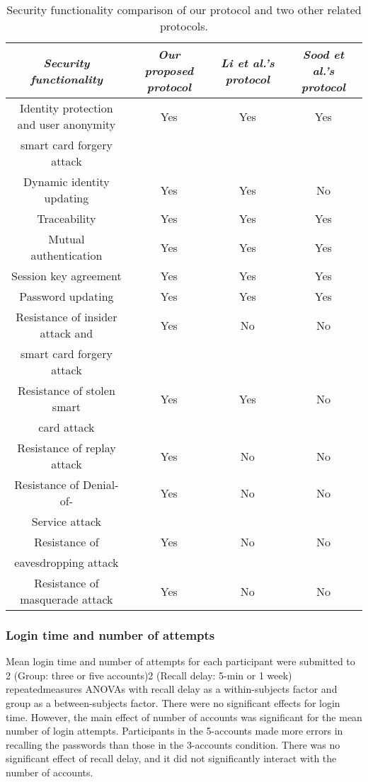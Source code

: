\documentclass[fleqn]{Paquetes/RevDigMatEduInt}
\begin{document}
\begin{table}[ht!!!]
	\begin{minipage}{0.7\textwidth}
	\caption{Security functionality comparison of our protocol and two other related protocols.}
	\centering
	\begin{tabular}{|c|c|c|c|}
 \hline
		\emph{Security functionality} & \emph{Our proposed protocol} & \emph{Li et al.’s protocol}  & \emph{Sood et al.’s protocol}\\ \midrule
		Identity protection and user anonymity & Yes & Yes & Yes\\ 
        smart card forgery attack &&& \\
		Dynamic identity updating & Yes & Yes & No \\
        Traceability & Yes & Yes & Yes \\
        Mutual authentication & Yes & Yes & Yes \\
        Session key agreement & Yes & Yes & Yes \\
        Password updating & Yes & Yes & Yes \\
        Resistance of insider attack and & Yes & No & No \\
        smart card forgery attack & & & \\
        Resistance of stolen smart & Yes & Yes & No \\
        card attack &&& \\
        Resistance of replay attack & Yes & No & No \\
        Resistance of Denial-of- & Yes & No & No \\
        Service attack &&& \\
        Resistance of & Yes & No & No \\
        eavesdropping attack &&& \\
        Resistance of masquerade attack & Yes & No & No \\ \bottomrule
	\end{tabular}
	\label{tabla:01}
	\end{minipage}
\end{table}



\subsubsection{Login time and number of attempts}
Mean login time and number of attempts for each participant were submitted to 2 (Group: three or five accounts)2 (Recall delay: 5-min or 1 week) repeatedmeasures ANOVAs with recall delay as a within-subjects factor and group as a between-subjects factor. There were no significant effects for login time. However, the main effect of number of accounts was significant for the mean number of login attempts. Participants in the 5-accounts made more errors in recalling the passwords than those in the 3-accounts condition. There was no significant effect of recall delay, and it did not significantly interact with the number of accounts.
\end{document}
